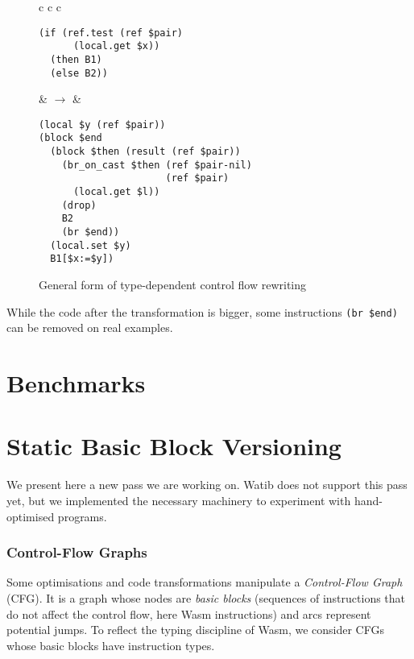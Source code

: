 \documentclass[a4paper,11pt]{article}
\begin{document}
\begin{figure}[h]
  \centering
  \begin{tabular}{c c c}
    \begin{minipage}{\widthof{\texttt{(if (ref.test (ref \$pair)}}}
\begin{verbatim}
(if (ref.test (ref $pair)
      (local.get $x))
  (then B1)
  (else B2))
\end{verbatim}
\end{minipage}
    &
    $\rightarrow$
    &
\begin{minipage}{\widthof{\texttt{....(br\_on\_cast \$then (ref \$pair-nil)}}}
\begin{verbatim}
(local $y (ref $pair))
(block $end
  (block $then (result (ref $pair))
    (br_on_cast $then (ref $pair-nil)
                      (ref $pair)
      (local.get $l))
    (drop)
    B2
    (br $end))
  (local.set $y)
  B1[$x:=$y])
\end{verbatim}
\end{minipage}
  \end{tabular}
  \caption{General form of type-dependent control flow rewriting}\label{br}
\end{figure}

While the code after the transformation is bigger, some instructions \texttt{(br
  \$end)} can be removed on real examples.

\section{Benchmarks}\label{bench}
\section{Static Basic Block Versioning}
We present here a new pass we are working on. \textsf{Watib} does not support
this pass yet, but we implemented the necessary machinery to experiment with
hand-optimised programs.
\subsubsection{Control-Flow Graphs}\label{cfg}
Some optimisations and code transformations manipulate a \emph{Control-Flow
Graph} (CFG). It is a graph whose nodes are \emph{basic blocks} (sequences of
instructions that do not affect the control flow, here Wasm instructions) and
arcs represent potential jumps. To reflect the typing discipline of Wasm, we
consider CFGs whose basic blocks have instruction types.
\end{document}
